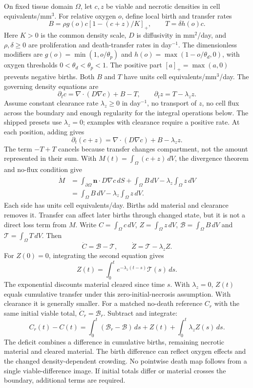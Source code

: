 On fixed tissue domain $\Omega$, let $c,z$ be viable and necrotic densities in cell equivalents/mm$^3$. For relative oxygen $o$, define local birth and transfer rates
\[
B=\rho g(o)c[1-(c+z)/K]_+,\qquad T=\delta h(o)c.
\]
Here $K>0$ is the common density scale, $D$ is diffusivity in mm$^2$/day, and $\rho,\delta\geq0$ are proliferation and death-transfer rates in day$^{-1}$. The dimensionless modifiers are $g(o)=\min(1,o/\theta_p)$ and $h(o)=\max(1-o/\theta_d,0)$, with oxygen thresholds $0<\theta_d<\theta_p<1$.
The positive part $[a]_+=\max(a,0)$ prevents negative births. Both $B$ and $T$ have units cell equivalents/mm$^3$/day. The governing density equations are
\[
\partial_tc=\nabla\!\cdot(D\nabla c)+B-T,\qquad
\partial_tz=T-\lambda_z z.
\]
Assume constant clearance rate $\lambda_z\geq0$ in day$^{-1}$, no transport of $z$, no cell flux across the boundary and enough regularity for the integral operations below. The shipped presets use $\lambda_z=0$; examples with clearance require a positive rate.
At each position, adding gives
\[
\partial_t(c+z)=\nabla\!\cdot(D\nabla c)+B-\lambda_z z.
\]
The term $-T+T$ cancels because transfer changes compartment, not the amount represented in their sum. With $M(t)=\int_\Omega(c+z)\,dV$, the divergence theorem and no-flux condition give
\[
\begin{aligned}
\dot M
&=\int_{\partial\Omega}\mathbf n\cdot D\nabla c\,dS
+\int_\Omega B\,dV-\lambda_z\int_\Omega z\,dV\\
&=\int_\Omega B\,dV-\lambda_z\int_\Omega z\,dV.
\end{aligned}
\]
Each side has units cell equivalents/day. Births add material and clearance removes it. Transfer can affect later births through changed state, but it is not a direct loss term from $M$.
Write $C=\int_\Omega c\,dV$, $Z=\int_\Omega z\,dV$, $\mathcal B=\int_\Omega B\,dV$ and $\mathcal T=\int_\Omega T\,dV$. Then
\[
\dot C=\mathcal B-\mathcal T,\qquad
\dot Z=\mathcal T-\lambda_z Z.
\]
For $Z(0)=0$, integrating the second equation gives
\[
Z(t)=\int_0^t e^{-\lambda_z(t-s)}\mathcal T(s)\,ds.
\]
The exponential discounts material cleared since time $s$. With $\lambda_z=0$, $Z(t)$ equals cumulative transfer under this zero-initial-necrosis assumption. With clearance it is generally smaller.
For a matched no-death reference $C_r$ with the same initial viable total, $\dot C_r=\mathcal B_r$. Subtract and integrate:
\[
C_r(t)-C(t)
=\int_0^t(\mathcal B_r-\mathcal B)\,ds
+Z(t)+\int_0^t\lambda_z Z(s)\,ds.
\]
The deficit combines a difference in cumulative births, remaining necrotic material and cleared material. The birth difference can reflect oxygen effects and the changed density-dependent crowding. No pointwise death map follows from a single viable-difference image. If initial totals differ or material crosses the boundary, additional terms are required.

